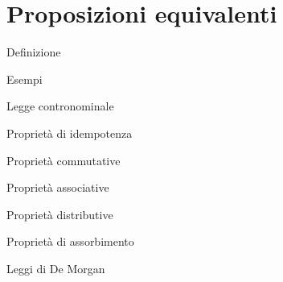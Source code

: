 \chapter{Proposizioni equivalenti}
\label{ch:equivalenza}

Definizione

Esempi

Legge contronominale

Proprietà di idempotenza

Proprietà commutative

Proprietà associative

Proprietà distributive

Proprietà di assorbimento

Leggi di De Morgan